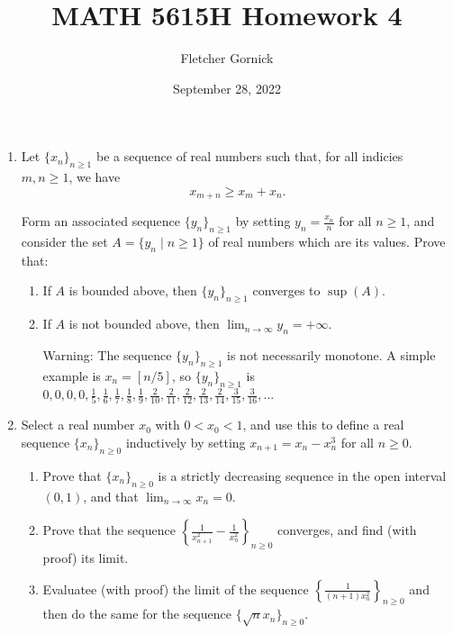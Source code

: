 \documentclass[11pt]{article}
\title{\vspace{-1.0cm}MATH 5615H Homework 4}
\author{Fletcher Gornick}
\date{September 28, 2022}
\begin{document}
 \maketitle
 \begin{enumerate}[leftmargin=0pt, label=\arabic*)]
   \item Let \(\{x_n\}_{n \geq 1}\) be a sequence of real numbers such that, for all indicies \(m, n \geq 1\), we have 
     \[x_{m+n} \geq x_m + x_n.\]

     Form an associated sequence \(\{y_n\}_{n \geq 1}\) by setting \(y_n = \frac{x_n}{n}\) for all \(n \geq 1\), and consider the set 
     \(A = \{y_n \;|\; n \geq 1\}\) of real numbers which are its values.  Prove that:
     \begin{enumerate}[label=(\roman*)]
       \item If \(A\) is bounded above, then \(\{y_n\}_{n \geq 1}\) converges to \(\sup(A)\).

       \item If \(A\) is not bounded above, then \(\displaystyle\lim_{n \to \infty} y_n = +\infty\).  

         Warning: The sequence \(\{y_n\}_{n \geq 1}\) is not necessarily monotone.  A simple example is \(x_n = [n/5]\), so
         \(\{y_n\}_{n \geq 1}\) is \(0,0,0,0,\frac{1}{5}, \frac{1}{6}, \frac{1}{7}, \frac{1}{8}, \frac{1}{9}, \frac{2}{10},
         \frac{2}{11}, \frac{2}{12}, \frac{2}{13}, \frac{2}{14}, \frac{3}{15}, \frac{3}{16}, \dots\)
     \end{enumerate}
     \newpage
     
   \item Select a real number \(x_0\) with \(0 < x_0 < 1\), and use this to define a real sequence \(\{x_n\}_{n \geq 0}\) 
     inductively by setting \(x_{n+1} = x_n - x_n^3\) for all \(n \geq 0\).
     \begin{enumerate}[label=(\roman*)]
       \item Prove that \(\{x_n\}_{n \geq 0}\) is a strictly decreasing sequence in the open interval \((0,1)\), and that 
         \(\displaystyle\lim_{n \to \infty} x_n = 0\).

       \item Prove that the sequence \(\left\{\frac{1}{x_{n+1}^2} - \frac{1}{x_n^2}\right\}_{n \geq 0}\) converges, and find (with 
         proof) its limit.
         
       \item Evaluatee (with proof) the limit of the sequence \(\left\{\frac{1}{(n+1)x_n^2}\right\}_{n \geq 0}\) and then do the 
         same for the sequence \(\{\sqrt{n}x_n\}_{n \geq 0}\).


\end{enumerate}
\end{enumerate}
\end{document}

